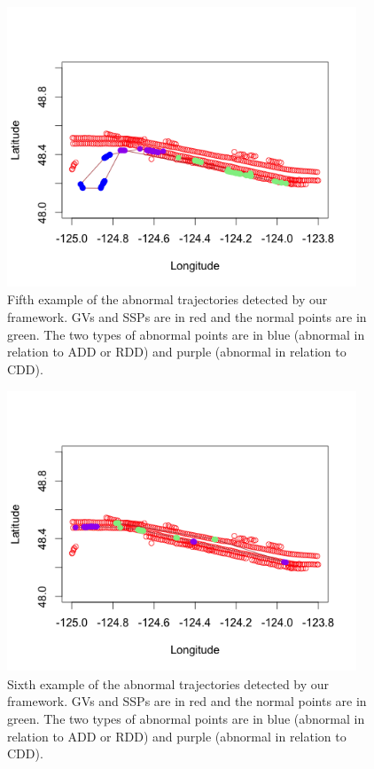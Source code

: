 \documentclass[12pt,glossary]{dalcsthesis}
\begin{document}
\begin{figure}[!hp]
\centering
\includegraphics[width=4.1in, height=3.3in]{p5.png}
\caption{Fifth example of the abnormal trajectories detected by our framework. GVs and SSPs are in red and the normal points are in green. The two types of abnormal points are in blue (abnormal in relation to ADD or RDD) and purple (abnormal in relation to CDD).}
\label{fig:anomalydetection_tra5}
\end{figure}

\begin{figure}[!hp]
\centering
\includegraphics[width=4.1in, height=3.3in]{p6.png}
\caption{Sixth example of the abnormal trajectories detected by our framework. GVs and SSPs are in red and the normal points are in green. The two types of abnormal points are in blue (abnormal in relation to ADD or RDD) and purple (abnormal in relation to CDD).}
\label{fig:anomalydetection_tra6}
\end{figure}
\end{document}
